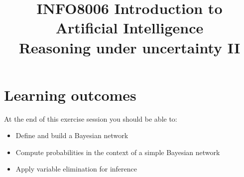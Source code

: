 \documentclass[9pt,a4paper]{extarticle}
\title{{\bf INFO8006 Introduction to Artificial Intelligence}\\[1em]
Reasoning under uncertainty II}
\date{}
\begin{document}
\maketitle
\vspace{-4em}

  \section*{Learning outcomes} 
      At the end of this exercise session you should be able to:
      \begin{itemize}
          \item Define and build a Bayesian network
          \item Compute probabilities in the context of a simple Bayesian network
          \item Apply variable elimination for inference
      \end{itemize}
\end{document}
